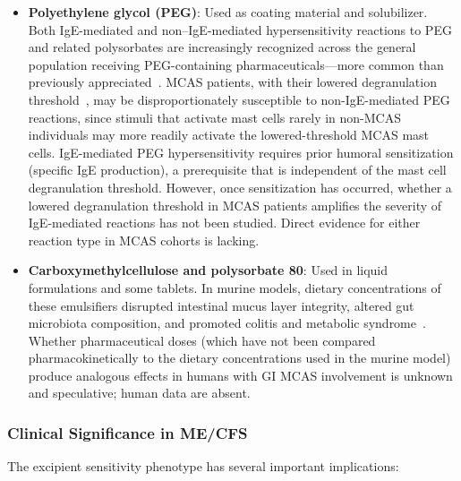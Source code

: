 \begin{itemize}
    \item \textbf{Polyethylene glycol (PEG)}: Used as coating material and solubilizer. Both IgE-mediated and non--IgE-mediated hypersensitivity reactions to PEG and related polysorbates are increasingly recognized across the general population receiving PEG-containing pharmaceuticals---more common than previously appreciated~\cite{Stone2019PEG}. MCAS patients, with their lowered degranulation threshold~\cite{Afrin2016}, may be disproportionately susceptible to non-IgE-mediated PEG reactions, since stimuli that activate mast cells rarely in non-MCAS individuals may more readily activate the lowered-threshold MCAS mast cells. IgE-mediated PEG hypersensitivity requires prior humoral sensitization (specific IgE production), a prerequisite that is independent of the mast cell degranulation threshold. However, once sensitization has occurred, whether a lowered degranulation threshold in MCAS patients amplifies the severity of IgE-mediated reactions has not been studied. Direct evidence for either reaction type in MCAS cohorts is lacking.
    \item \textbf{Carboxymethylcellulose and polysorbate 80}: Used in liquid formulations and some tablets. In murine models, dietary concentrations of these emulsifiers disrupted intestinal mucus layer integrity, altered gut microbiota composition, and promoted colitis and metabolic syndrome~\cite{Chassaing2015emulsifiers}. Whether pharmaceutical doses (which have not been compared pharmacokinetically to the dietary concentrations used in the murine model) produce analogous effects in humans with GI MCAS involvement is unknown and speculative; human data are absent.
\end{itemize}

\subsubsection{Clinical Significance in ME/CFS}

The excipient sensitivity phenotype has several important implications:

